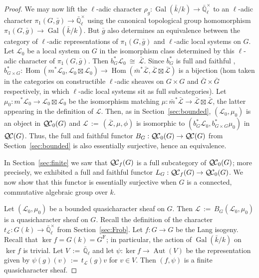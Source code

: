\documentclass{amsart}
\theoremstyle{plain}
\theoremstyle{definition}
\theoremstyle{remark}
\newcommand{\EE}{\mathbb{\bar Q}_\ell}
\newcommand{\bFq}{\bar{k}}
\newcommand{\Fq}{k}
\newcommand{\EEx}{\EE^\times}
\DeclareMathOperator{\Gal}{Gal}
\newcommand{\Frob}[1]{\operatorname{F}_{#1}}
\DeclareMathOperator{\Aut}{Aut}
\DeclareMathOperator{\Hom}{Hom}
\newcommand{\ceq}{{\, :=\, }}
\newcommand{\iso}{{\ \cong\ }}
\newcommand{\qcs}[1]{{\mathcal{#1}}}
\newcommand{\gqcs}[1]{{\mathcal{\bar #1}}}
\newcommand{\QC}{{\mathcal{Q\hskip-0.8pt C}}}
\newcommand{\QCb}{{\QC_0}}
\newcommand{\QCf}{{\QC_f}}
\newcommand{\trFrob}[1]{t_{#1}}
\newcommand{\bg}{\bar{g}}
\begin{document}
\begin{proof}
  We may now lift the $\ell$-adic character $\rho_g : \Gal(\bFq/\Fq) \to \EEx$
  to an $\ell$-adic character $\pi_1(G,\bg) \to \EEx$ using the canonical topological group homomorphism
  $\pi_1(G,\bg) \to \Gal(\bFq/\Fq)$. But $\bg$ also
  determines an equivalence between the category of $\ell$-adic
  representations of $\pi_1(G,\bg)$ and $\ell$-adic local systems on $G$. Let
  $\qcs{L}_0$ be a local system on $G$ in the isomorphism class
  determined by this $\ell$-adic character of $\pi_1(G,\bg)$.
  Then $b_G^*\qcs{L}_0 \iso \gqcs{L}$.
  Since $b_G^*$ is full and faithful
  ,
  $
  b_{G\times G}^* : \Hom(m^*\qcs{L}_0,\qcs{L}_0\boxtimes\qcs{L}_0) \to \Hom({\bar m}^*\gqcs{L},\gqcs{L}\boxtimes\gqcs{L})
  $ 
  is a bijection 
  (hom taken in the categories on constructible $\ell$-adic sheaves on 
  $G\times G$ and ${\bar G}\times {\bar G}$ respectively, 
  in which $\ell$-adic local systems sit as full subcategories). 
  Let $\mu_0 : m^*\qcs{L}_0 \to \qcs{L}_0\boxtimes\qcs{L}_0$ be the isomorphism matching 
  $\mu : {\bar m}^*\gqcs{L} \to \gqcs{L}\boxtimes\gqcs{L}$, 
  the latter appearing in the definition of $\qcs{L}$. 
  Then, as in Section~\ref{sec:bounded}, $(\qcs{L}_0,\mu_0)$ is an object in $\QCb(G)$ 
  and $\qcs{L} \ceq (\gqcs{L},\mu,\phi)$ is isomorphic to $(b_G^*\qcs{L}_0,b_{G\times G}^*\mu_0)$ in $\QC(G)$.
  Thus, the full and faithful functor $B_G : \QCb(G) \to \QC(G)$ from Section~\ref{sec:bounded}
  is also essentially surjective, hence an equivalence.
  
  In Section~\ref{sec:finite} we saw that $\QCf(G)$ is a full subcategory of $\QCb(G)$;
  more precisely, we exhibited a full and faithful functor $L_G : \QCf(G) \to \QCb(G)$.
  We now show that this functor is essentially surjective 
  when $G$ is a connected, commutative algebraic group over $\Fq$.
  
  Let $(\qcs{L}_0,\mu_0)$ be a bounded quasicharacter sheaf on $G$. 
  Then $\qcs{L}\ceq B_G(\qcs{L}_0,\mu_0)$ is a quasicharacter sheaf on $G$.
  Recall the definition of the character $\trFrob{\qcs{L}} : G(\Fq) \to \EEx$ from Section~\ref{sec:Frob}. 
  Let $f : G\to G$ be the Lang isogeny.
  Recall that $\ker f = G(\Fq) = G^{\Frob{}}$; 
  in particular, the action of $\Gal(\bFq/\Fq)$ on $\ker f$ is trivial.
  Let $V \ceq \EE$ and let $\psi : \ker f \to \Aut(V)$ be the representation given by 
  $\psi(g)(v) \ceq \trFrob{\qcs{L}}(g) v$ for $v\in V$. 
  Then $(f,\psi)$ is a finite quasicharacter sheaf. 
  

\end{proof}
\end{document}
